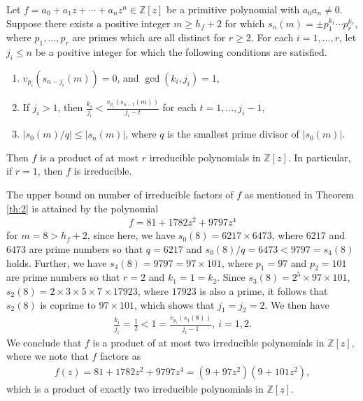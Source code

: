 \documentclass[12pt]{amsart}%
\begin{document}
\begin{theorem}\label{th:2}
Let $f=a_0+a_1 z +\cdots+a_nz^n\in \mathbb{Z}[z]$ be a primitive polynomial with $a_0a_n\neq 0$. Suppose there exists a positive integer $m\geq h_f+2$ for which $s_n(m)=\pm p_1^{k_1}\cdots p_r^{k_r}$,  where $p_1,\ldots, p_r$ are  primes which are all distinct for $r\geq 2$.  For each $i=1,\ldots, r$, let $j_i\leq n$ be a positive integer for which the following conditions are satisfied.
\begin{enumerate}
\item[(i)] $v_{p_i}(s_{n-j_i}(m))=0$, and $\gcd(k_i,j_i)=1$,
\item[(ii)] If $j_i>1$, then $\frac{k_i}{j_i}<\frac{v_{p_i}(s_{n-t}(m))}{j_i-t}$ for each $t=1,\ldots,j_i-1$,
\item[(iii)] $|s_0(m)/q|\leq |s_n(m)|$, where $q$ is the smallest prime divisor of $|s_0(m)|$.
\end{enumerate}
Then $f$ is a product of at most $r$ irreducible polynomials in $\mathbb{Z}[z]$. In particular, if $r=1$, then $f$ is irreducible.
\end{theorem}
The upper bound on number of irreducible factors of $f$ as mentioned in Theorem \ref{th:2} is attained by the polynomial
\begin{eqnarray*}
f=81 + 1782 z^2 + 9797 z^4
\end{eqnarray*}
for $m=8>h_f+2$, since here, we have $s_0(8)=6217\times 6473$, where $6217$ and $6473$ are prime numbers so that $q=6217$ and $s_0(8)/q=6473<9797=s_4(8)$ holds. Further, we have $s_4(8)=9797=97\times 101$, where $p_1=97$ and $p_2=101$ are prime numbers so that $r=2$ and $k_1=1=k_2$. Since $s_3(8)=2^5\times 97\times 101$, $s_2(8)=2\times 3\times 5\times 7\times 17923$, where $17923$ is also a prime, it follows that $s_2(8)$ is coprime to $97\times 101$, which shows that $j_1=j_2=2$. We then have
\begin{eqnarray*}
\frac{k_i}{j_i}=\frac{1}{2}<1=\frac{v_{p_i}(s_3(8))}{j_i-1},~i=1,2.
\end{eqnarray*}
We conclude that $f$ is a product of at most two irreducible polynomials in $\mathbb{Z}[z]$, where we note that $f$ factors as
 \begin{eqnarray*}
f(z)=81 + 1782 z^2 + 9797 z^4=(9 + 97 z^2) (9 + 101 z^2),
\end{eqnarray*}
which is a product of exactly two irreducible polynomials in $\mathbb{Z}[z]$.
\end{document}
